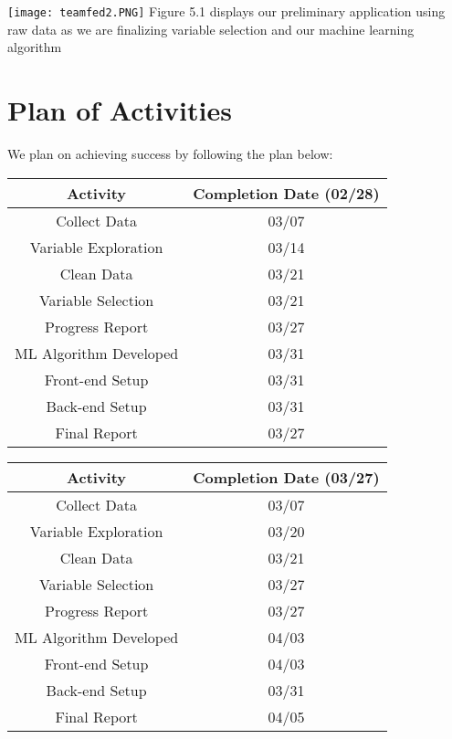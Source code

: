 \documentclass[sigconf,nonacm,11pt]{acmart}
\begin{document}
\texttt{[image: teamfed2.PNG]}
Figure 5.1 displays our preliminary application using raw data as we are finalizing variable selection and our machine learning algorithm \vspace{-0.5em}


\section{Plan of Activities}

We plan on achieving success by following the plan below:\vspace{0.07em}
\begin{center}
    \begin{tabular}{||c|c||}
    \hline
    Activity & Completion Date (02/28)\\
    \hline\hline
    Collect Data & 03/07\\
    Variable Exploration & 03/14\\
    Clean Data & 03/21\\
    Variable Selection & 03/21\\
    Progress Report & 03/27\\
    ML Algorithm Developed & 03/31\\
    Front-end Setup & 03/31 \\
    Back-end Setup & 03/31 \\
    Final Report & 03/27\\
    \hline
    \end{tabular}
\end{center}

\begin{center}
    \begin{tabular}{||c|c||}
    \hline
    Activity & Completion Date (03/27)\\
    \hline\hline
    Collect Data & 03/07\\
    Variable Exploration & 03/20\\
    Clean Data & 03/21\\
    Variable Selection & 03/27\\
    Progress Report & 03/27\\
    ML Algorithm Developed & 04/03\\
    Front-end Setup & 04/03\\
    Back-end Setup & 03/31\\
    Final Report & 04/05\\
    \hline
    \end{tabular}
\end{center}
\end{document}
